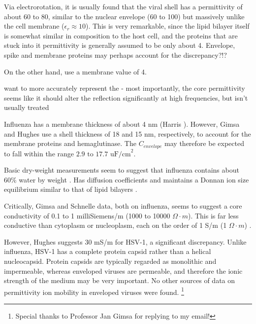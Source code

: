 \documentclass[fleqn,10pt]{article}
\begin{document}
Via electrorotation, it is usually found that the viral shell has a permittivity of about 60 to 80, similar to the nuclear envelope (60 to 100) but massively unlike the cell membrane ($\epsilon_r\approx 10$). This is very remarkable, since the lipid bilayer itself is somewhat similar in composition to the host cell, and the proteins that are stuck into it permittivity is generally assumed to be only about 4. Envelope, spike and membrane proteins may perhaps account for the discrepancy?!?

On the other hand, \cite{Electrostatic2020a} use a membrane value of 4.

want to more accurately represent the - most importantly, the core permittivity seems like it should alter the reflection significantly at high frequencies, but isn't usually treated 

Influenza has a membrane thickness of about 4 nm (Harris \cite{Influenza2006}). However, Gimsa and Hughes use a shell thickness of 18 and 15 nm, respectively, to account for the membrane proteins and hemaglutinase. The $C_{envelope}$ may therefore be expected to fall within the range $2.9 \text{ to } 17.7 \text{ uF/cm}^2$.

Basic dry-weight measurements seem to suggest that influenza contains about 60\% water by weight \cite{lauffer1944biophysical}. Has diffusion coefficients and maintains a Donnan ion size equilibrium similar to that of lipid bilayers \cite{Effect2015b}.


% 

Critically, Gimsa and Schnelle data, both on influenza, seems to suggest a core conductivity of 0.1 to 1 milliSiemens/m (1000 to 10000 $\Omega \cdot m$). This is far less conductive than cytoplasm or nucleoplasm, each on the order of 1 S/m (1 $\Omega \cdot m$) \cite{Study2001}. 

However, Hughes suggests 30 mS/m for HSV-1, a significant discrepancy. Unlike influenza, HSV-1 has a complete protein capsid rather than a helical nucleocapsid. Protein capsids are typically regarded as monolithic and impermeable, whereas enveloped viruses are permeable, and therefore the ionic strength of the medium may be very important. No other sources of data on permittivity ion mobility in enveloped viruses were found.  \footnote{Special thanks to Professor Jan Gimsa for replying to my email!}
\end{document}
